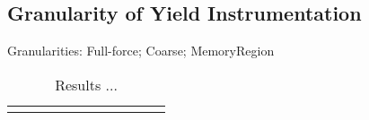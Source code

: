 \subsection{Granularity of Yield Instrumentation}
\label{eval:granularity}

Granularities: Full-force; Coarse; MemoryRegion

\newcommand{\colspacing}{\hspace{1.8em}}
\begin{table*}[t]
\small
\centering
\begin{tabular}{l rr rr rr rr rr}
\centering

\end{tabular}
\caption{Results ...}
\label{tab:granularity}
\end{table*}